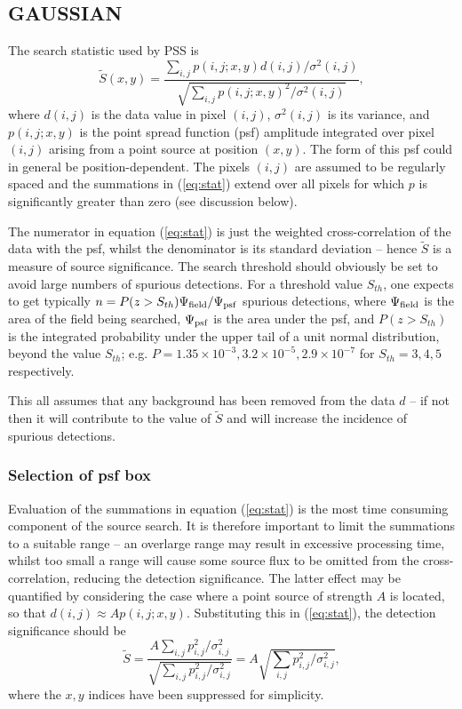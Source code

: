 \subsection{GAUSSIAN}
\label{alg:gauss}

The search statistic used by PSS is
\begin{equation} \label{eq:stat}
\tilde{S}(x,y) = \frac{\displaystyle \sum_{i,j} p(i,j;x,y) d(i,j) /
\sigma^2(i,j)} {\displaystyle \sqrt{\sum_{i,j} p(i,j;x,y)^2 /\sigma^2(i,j)}}, 
\end{equation}
where $d(i,j)$ is the data value in pixel $(i,j)$, $\sigma^2(i,j)$ is its 
variance, and $p(i,j;x,y)$ is the point spread function (psf) amplitude
integrated over
pixel $(i,j)$ arising from a point source at position $(x,y)$. The form of 
this psf could in general be position-dependent. The pixels $(i,j)$ are 
assumed to be regularly spaced and the summations in (\ref{eq:stat}) extend
over all pixels for which $p$ is significantly greater than zero (see 
discussion below).

The numerator in equation (\ref{eq:stat}) is just the weighted
cross-correlation of the 
data with the psf, whilst the denominator is its standard deviation -- hence 
$\tilde{S}$ is a measure of source significance. The search threshold should 
obviously be set to avoid large numbers of spurious detections. For a 
threshold value $S_{th}$, one expects to get typically 
$n=P(z>S_{th})\Psi_{\rm field}/\Psi_{\rm psf}$ spurious detections, where 
$\Psi_{\rm field}$ is the area of the field being searched, $\Psi_{\rm psf}$ is 
the area under the psf, and $P(z>S_{th})$ is the integrated probability under 
the upper tail of a unit normal distribution, beyond the value $S_{th}$;
e.g. $P=1.35 \times 10^{-3}, 3.2 \times 10^{-5}, 2.9 \times 10^{-7}$ for 
$S_{th}=3, 4, 5$ respectively.

This all assumes that any background has been removed 
from the data $d$ -- if not then it will contribute to the value of 
$\tilde{S}$ and will increase the incidence of spurious detections.

\subsubsection{Selection of psf box}
\label{psfpix-choice}
Evaluation of the summations in equation (\ref{eq:stat}) is the most time
consuming component of the source search. It is therefore important to limit
the summations to a suitable range -- an overlarge range may result in
excessive processing time, whilst too small a range will cause some source
flux to be omitted from the cross-correlation, reducing the detection
significance. The latter effect may be quantified by considering the case
where a point source of strength $A$ is located, so that 
$d(i,j)\approx Ap(i,j;x,y)$. Substituting this in (\ref{eq:stat}), the 
detection significance should be
\begin{equation} \label{eq:sig}
\tilde{S} = \frac{\displaystyle A \sum_{i,j} p_{i,j}^2  /\sigma^2_{i,j}} 
{\displaystyle \sqrt{\sum_{i,j} p_{i,j}^2 /\sigma^2_{i,j}}}
=  A \sqrt{\sum_{i,j} p_{i,j}^2  /\sigma^2_{i,j}} ,
\end{equation}
where the $x,y$ indices have been suppressed for simplicity.

